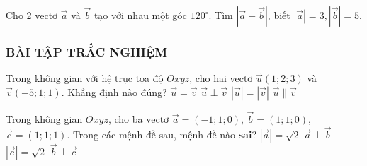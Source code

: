 \begin{vd}%
	Cho 2 vectơ $\overrightarrow{a}$ và $\overrightarrow{b}$ tạo với nhau một góc $120^\circ$. Tìm $\left|\overrightarrow{a}-\overrightarrow{b}\right|$, biết $|\overrightarrow{a}|=3,\left|\overrightarrow{b}\right|=5$.
\end{vd}
\subsubsection{BÀI TẬP TRẮC NGHIỆM}
\begin{ex}%
	Trong không gian với hệ trục tọa độ $Oxyz$, cho hai vectơ $\vec{u}\left(1;2;3\right)$ và $\vec{v}\left(-5;1;1\right)$. Khẳng định nào đúng?
	\choice
	{$\vec{u}=\vec{v}$}
	{\True $\vec{u}\perp \vec{v}$}
	{$\left| \vec{u}\right|=\left| \vec{v}\right|$}
	{$\vec{u}\parallel\vec{v}$}
\end{ex}
\begin{ex}%
	Trong không gian $Oxyz$, cho ba vectơ $ \overrightarrow{a}=(-1;1;0) $, $  \overrightarrow{b}=(1;1;0) $, $ \overrightarrow{c}=(1;1;1) $. Trong các mệnh đề sau, mệnh đề nào \textbf{sai}?
	\choice
	{$\left|\overrightarrow{a}\right| = \sqrt{2} $}
	{$ \overrightarrow{a} \perp \overrightarrow{b} $}
	{$ \left|\overrightarrow{c}\right| = \sqrt{2}$}
	{\True $ \overrightarrow{b} \perp \overrightarrow{c} $}
\end{ex}
